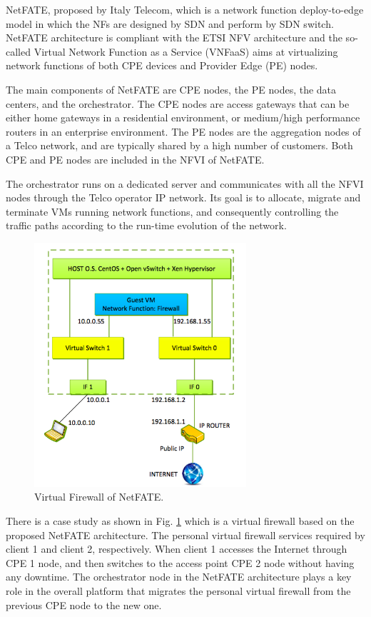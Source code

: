 NetFATE\cite{netfate}, proposed by Italy Telecom, which is a network function deploy-to-edge model in which the NFs are designed by SDN and perform by SDN switch. NetFATE architecture is compliant with the ETSI NFV architecture\cite{etsi-nfv-archi} and the so-called Virtual Network Function as a Service (VNFaaS) aims at virtualizing network functions of both CPE devices and Provider Edge (PE) nodes.

The main components of NetFATE are CPE nodes, the PE nodes, the data centers, and the orchestrator.
The CPE nodes are access gateways that can be either home gateways in a residential environment, or medium/high performance routers in an enterprise environment.
The PE nodes are the aggregation nodes of a Telco network, and are typically shared by a high number of customers. Both CPE and PE nodes are included in the NFVI of NetFATE.

The orchestrator runs on a dedicated server and communicates with all the NFVI nodes through the Telco operator IP network. Its goal is to allocate, migrate and terminate VMs running network functions, and consequently controlling the traffic paths according to the run-time evolution of the network.

\begin{figure}[!t]
\centering
\includegraphics[width=0.7\textwidth]{./fig/netfate.png}
\caption{Virtual Firewall of NetFATE. \cite{netfate}}
\label{fig:netfate}
\end{figure}

There is a case study as shown in Fig. \ref{fig:netfate} which is a virtual firewall based on the proposed NetFATE architecture. The personal virtual firewall services required by client 1 and client 2, respectively. When client 1 accesses the Internet through CPE 1 node, and then switches to the access point CPE 2 node without having any downtime. The orchestrator node in the NetFATE architecture plays a key role in the overall platform that migrates the personal virtual firewall from the previous CPE node to the new one.

